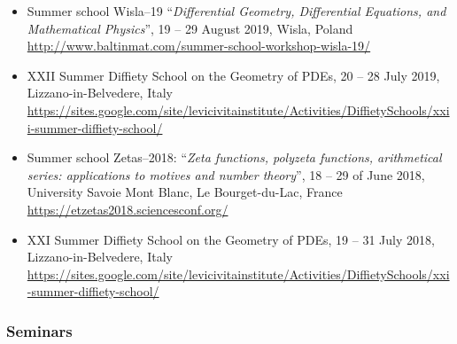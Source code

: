 \documentclass[final, a4paper, oneside, 12pt]{article}
\numberwithin{equation}{section}
\begin{document}
\begin{itemize}

  \item Summer school Wisla--19 ``\textit{Differential Geometry, Differential Equations, and Mathematical Physics}'', 19 -- 29 August 2019, Wisla, Poland \\
  \url{http://www.baltinmat.com/summer-school-workshop-wisla-19/}

  \item XXII Summer Diffiety School on the Geometry of PDEs, 20 -- 28 July 2019, Lizzano-in-Belvedere, Italy \\
  \url{https://sites.google.com/site/levicivitainstitute/Activities/DiffietySchools/xxii-summer-diffiety-school/}

  \item Summer school Zetas--2018: ``\textit{Zeta functions, polyzeta functions, arithmetical series: applications to motives and number theory}'', 18 -- 29 of June 2018, University Savoie Mont Blanc, Le Bourget-du-Lac, France \\
  \url{https://etzetas2018.sciencesconf.org/}
  
  \item XXI Summer Diffiety School on the Geometry of PDEs, 19 -- 31 July 2018, Lizzano-in-Belvedere, Italy \\
  \url{https://sites.google.com/site/levicivitainstitute/Activities/DiffietySchools/xxi-summer-diffiety-school/}

\end{itemize}

\subsubsection{Seminars}
\end{document}
